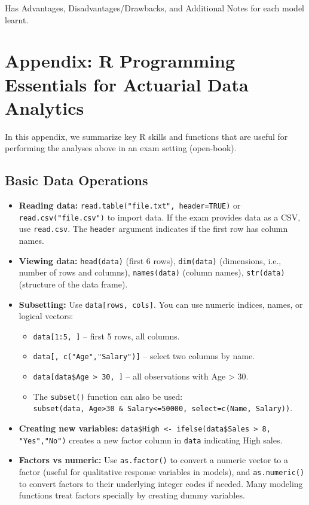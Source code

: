 \documentclass[11pt]{article}
\begin{document}
\noindent Has Advantages, Disadvantages/Drawbacks, and Additional Notes for each model learnt.


\section{Appendix: R Programming Essentials for Actuarial Data Analytics}
In this appendix, we summarize key R skills and functions that are useful for performing the analyses above in an exam setting (open-book).

\subsection{Basic Data Operations}
\begin{itemize}
    \item \textbf{Reading data:} \verb|read.table("file.txt", header=TRUE)| or \verb|read.csv("file.csv")| to import data. If the exam provides data as a CSV, use \texttt{read.csv}. The \texttt{header} argument indicates if the first row has column names.
    
    \item \textbf{Viewing data:} \verb|head(data)| (first 6 rows), \verb|dim(data)| (dimensions, i.e., number of rows and columns), \verb|names(data)| (column names), \verb|str(data)| (structure of the data frame).
    
    \item \textbf{Subsetting:} Use \verb|data[rows, cols]|. You can use numeric indices, names, or logical vectors:
    \begin{itemize}
        \item \verb|data[1:5, ]| – first 5 rows, all columns.
        \item \verb|data[, c("Age","Salary")]| – select two columns by name.
        \item \verb|data[data$Age > 30, ]| – all observations with Age > 30.
        \item The \texttt{subset()} function can also be used: \\
        \verb|subset(data, Age>30 & Salary<=50000, select=c(Name, Salary))|.
    \end{itemize}
    
    \item \textbf{Creating new variables:} \verb|data$High <- ifelse(data$Sales > 8, "Yes","No")| creates a new factor column in \texttt{data} indicating High sales.
    
    \item \textbf{Factors vs numeric:} Use \verb|as.factor()| to convert a numeric vector to a factor (useful for qualitative response variables in models), and \verb|as.numeric()| to convert factors to their underlying integer codes if needed. Many modeling functions treat factors specially by creating dummy variables.
\end{itemize}
\end{document}

